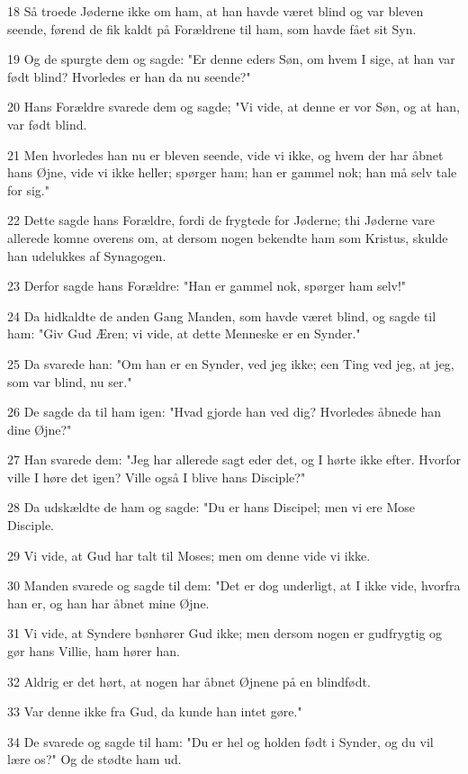 \par 18 Så troede Jøderne ikke om ham, at han havde været blind og var bleven seende, førend de fik kaldt på Forældrene til ham, som havde fået sit Syn.
\par 19 Og de spurgte dem og sagde: "Er denne eders Søn, om hvem I sige, at han var født blind? Hvorledes er han da nu seende?"
\par 20 Hans Forældre svarede dem og sagde; "Vi vide, at denne er vor Søn, og at han, var født blind.
\par 21 Men hvorledes han nu er bleven seende, vide vi ikke, og hvem der har åbnet hans Øjne, vide vi ikke heller; spørger ham; han er gammel nok; han må selv tale for sig."
\par 22 Dette sagde hans Forældre, fordi de frygtede for Jøderne; thi Jøderne vare allerede komne overens om, at dersom nogen bekendte ham som Kristus, skulde han udelukkes af Synagogen.
\par 23 Derfor sagde hans Forældre: "Han er gammel nok, spørger ham selv!"
\par 24 Da hidkaldte de anden Gang Manden, som havde været blind, og sagde til ham: "Giv Gud Æren; vi vide, at dette Menneske er en Synder."
\par 25 Da svarede han: "Om han er en Synder, ved jeg ikke; een Ting ved jeg, at jeg, som var blind, nu ser."
\par 26 De sagde da til ham igen: "Hvad gjorde han ved dig? Hvorledes åbnede han dine Øjne?"
\par 27 Han svarede dem: "Jeg har allerede sagt eder det, og I hørte ikke efter. Hvorfor ville I høre det igen? Ville også I blive hans Disciple?"
\par 28 Da udskældte de ham og sagde: "Du er hans Discipel; men vi ere Mose Disciple.
\par 29 Vi vide, at Gud har talt til Moses; men om denne vide vi ikke.
\par 30 Manden svarede og sagde til dem: "Det er dog underligt, at I ikke vide, hvorfra han er, og han har åbnet mine Øjne.
\par 31 Vi vide, at Syndere bønhører Gud ikke; men dersom nogen er gudfrygtig og gør hans Villie, ham hører han.
\par 32 Aldrig er det hørt, at nogen har åbnet Øjnene på en blindfødt.
\par 33 Var denne ikke fra Gud, da kunde han intet gøre."
\par 34 De svarede og sagde til ham: "Du er hel og holden født i Synder, og du vil lære os?" Og de stødte ham ud.

